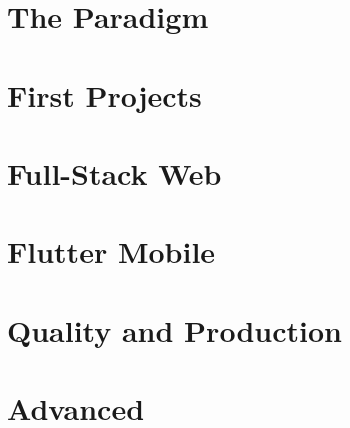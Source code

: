 \documentclass[10pt,twoside,openright]{book}
\begin{document}
\frontmatter

\tableofcontents


\mainmatter

\part{The Paradigm}




\part{First Projects}




\part{Full-Stack Web}





\part{Flutter Mobile}




\part{Quality and Production}



\part{Advanced}

\end{document}
